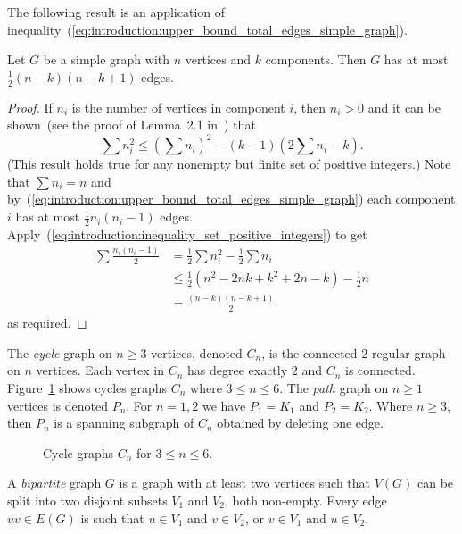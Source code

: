 The following result is an application of
inequality~(\ref{eq:introduction:upper_bound_total_edges_simple_graph}).

\begin{theorem}
Let $G$ be a simple graph with $n$ vertices and $k$ components. Then
$G$ has at most $\frac{1}{2} (n - k)(n - k + 1)$ edges.
\end{theorem}

\begin{proof}
If $n_i$ is the number of vertices in component $i$, then $n_i > 0$
and it can be shown~(see the proof of Lemma~2.1
in~\cite[pp.21--22]{Foulds1992}) that
%
\begin{equation}
\label{eq:introduction:inequality_set_positive_integers}
\sum n_i^2
\leq
\left(\sum n_i\right)^2 - (k - 1) \left(2 \sum n_i - k\right).
\end{equation}
%
(This result holds true for any nonempty but finite set of positive
integers.) Note that $\sum n_i = n$ and
by~(\ref{eq:introduction:upper_bound_total_edges_simple_graph}) each
component $i$ has at most $\frac{1}{2} n_i (n_i - 1)$
edges. Apply~(\ref{eq:introduction:inequality_set_positive_integers})
to get
%
\begin{align*}
\sum \frac{n_i (n_i - 1)}{2}
&=
\frac{1}{2} \sum n_i^2 - \frac{1}{2} \sum n_i \\[4pt]
&\leq
\frac{1}{2} (n^2 - 2nk + k^2 + 2n - k) - \frac{1}{2} n \\[4pt]
&=
\frac{(n - k) (n - k + 1)}{2}
\end{align*}
%
as required.
\end{proof}

The \emph{cycle} graph on $n \geq 3$ vertices, denoted $C_n$, is the
connected $2$-regular graph on $n$ vertices. Each vertex in $C_n$ has
degree exactly $2$ and $C_n$ is
connected. Figure~\ref{fig:introduction:four_cycle_graphs} shows
cycles graphs $C_n$ where $3 \leq n \leq 6$. The \emph{path} graph on
$n \geq 1$ vertices is denoted $P_n$. For $n = 1, 2$ we have
$P_1 = K_1$ and $P_2 = K_2$. Where $n \geq 3$, then $P_n$ is a
spanning subgraph of $C_n$ obtained by deleting one edge.

\begin{figure}[!htbp]
\centering

\caption{Cycle graphs $C_n$ for $3 \leq n \leq 6$.}
\label{fig:introduction:four_cycle_graphs}
\end{figure}

A \emph{bipartite} graph $G$ is a graph with at least two
vertices such that $V(G)$ can be split into two disjoint subsets $V_1$
and $V_2$, both non-empty. Every edge $uv \in E(G)$ is such that
$u \in V_1$ and $v \in V_2$, or $v \in V_1$ and $u \in V_2$.

